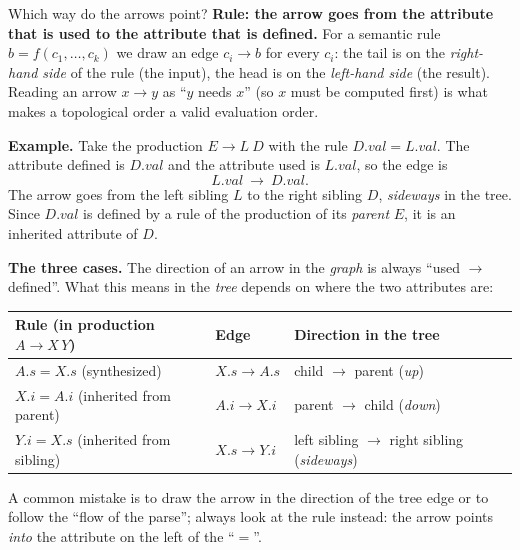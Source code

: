 \documentclass[11pt,a4paper]{article}
\newcommand{\at}[2]{\ensuremath{#1.\mathit{#2}}}
\begin{document}
\begin{notebox}{Which way do the arrows point?}
\textbf{Rule: the arrow goes from the attribute that is used to the attribute that is defined.} For a semantic rule $b = f(c_1,\dots,c_k)$ we draw an edge $c_i \to b$ for every $c_i$: the tail is on the \emph{right-hand side} of the rule (the input), the head is on the \emph{left-hand side} (the result). Reading an arrow $x\to y$ as ``$y$ needs $x$'' (so $x$ must be computed first) is what makes a topological order a valid evaluation order.

\textbf{Example.} Take the production $E \to L\ D$ with the rule $\at{D}{val} = \at{L}{val}$. The attribute defined is $\at{D}{val}$ and the attribute used is $\at{L}{val}$, so the edge is
\[
\at{L}{val}\ \longrightarrow\ \at{D}{val}.
\]
The arrow goes from the left sibling $L$ to the right sibling $D$, \emph{sideways} in the tree. Since $\at{D}{val}$ is defined by a rule of the production of its \emph{parent} $E$, it is an inherited attribute of $D$.

\begin{center}
\end{center}

\textbf{The three cases.} The direction of an arrow in the \emph{graph} is always ``used $\to$ defined''. What this means in the \emph{tree} depends on where the two attributes are:
\begin{center}
\small
\begin{tabular}{@{}L{4.2cm} L{4.6cm} L{4.2cm}@{}}
\toprule
\textbf{Rule (in production $A\to X\,Y$)} & \textbf{Edge} & \textbf{Direction in the tree} \\ \midrule
$\at{A}{s}=\at{X}{s}$ (synthesized) & $\at{X}{s}\to\at{A}{s}$ & child $\to$ parent (\emph{up}) \\
$\at{X}{i}=\at{A}{i}$ (inherited from parent) & $\at{A}{i}\to\at{X}{i}$ & parent $\to$ child (\emph{down}) \\
$\at{Y}{i}=\at{X}{s}$ (inherited from sibling) & $\at{X}{s}\to\at{Y}{i}$ & left sibling $\to$ right sibling (\emph{sideways}) \\ \bottomrule
\end{tabular}
\end{center}
A common mistake is to draw the arrow in the direction of the tree edge or to follow the ``flow of the parse''; always look at the rule instead: the arrow points \emph{into} the attribute on the left of the ``$=$''.
\end{notebox}
\end{document}
